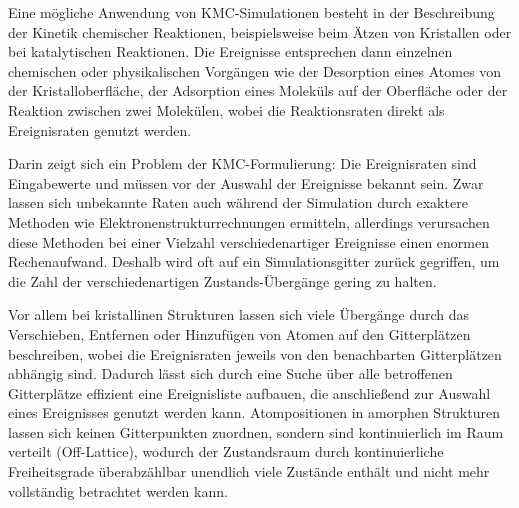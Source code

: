 Eine mögliche Anwendung von KMC-Simulationen besteht in der Beschreibung der Kinetik chemischer Reaktionen, beispielsweise beim Ätzen von Kristallen\cite{gosalvez_atomistic_2008} oder bei katalytischen Reaktionen\cite{stamatakis_unraveling_2012}.
Die Ereignisse entsprechen dann einzelnen chemischen oder physikalischen Vorgängen wie der Desorption eines Atomes von der Kristalloberfläche, der Adsorption eines Moleküls auf der Oberfläche oder der Reaktion zwischen zwei Molekülen, wobei die Reaktionsraten direkt als Ereignisraten genutzt werden.

Darin zeigt sich ein Problem der KMC-Formulierung:
Die Ereignisraten sind Eingabewerte und müssen vor der Auswahl der Ereignisse bekannt sein.
Zwar lassen sich unbekannte Raten auch während der Simulation durch exaktere Methoden wie Elektronenstrukturrechnungen ermitteln, allerdings verursachen diese Methoden bei einer Vielzahl verschiedenartiger Ereignisse einen enormen Rechenaufwand.
Deshalb wird oft auf ein Simulationsgitter zurück gegriffen, um die Zahl der verschiedenartigen Zustands-Übergänge gering zu halten.

Vor allem bei kristallinen Strukturen lassen sich viele Übergänge durch das Verschieben, Entfernen oder Hinzufügen von Atomen auf den Gitterplätzen beschreiben, wobei die Ereignisraten jeweils von den benachbarten Gitterplätzen abhängig sind.
Dadurch lässt sich durch eine Suche über alle betroffenen Gitterplätze effizient eine Ereignisliste aufbauen, die anschließend zur Auswahl eines Ereignisses genutzt werden kann.
Atompositionen in amorphen Strukturen lassen sich keinen Gitterpunkten zuordnen, sondern sind kontinuierlich im Raum verteilt (Off-Lattice), wodurch der Zustandsraum durch kontinuierliche Freiheitsgrade überabzählbar unendlich viele Zustände enthält und nicht mehr vollständig betrachtet werden kann.

